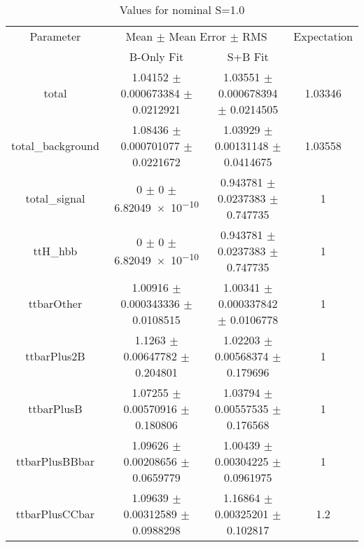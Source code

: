 \begin{table}
\centering
\caption{Values for nominal S=1.0}
\begin{tabular}{cccc}
\toprule
Parameter & \multicolumn{2}{c}{Mean $\pm$ Mean Error $\pm$ RMS} & Expectation\\
 & B-Only Fit & S+B Fit & \\
\midrule
total & \num{1.04152} $\pm$ \num{0.000673384} $\pm$ \num{0.0212921} & \num{1.03551} $\pm$ \num{0.000678394} $\pm$ \num{0.0214505} & \num{1.03346}\\
total\_background & \num{1.08436} $\pm$ \num{0.000701077} $\pm$ \num{0.0221672} & \num{1.03929} $\pm$ \num{0.00131148} $\pm$ \num{0.0414675} & \num{1.03558}\\
total\_signal & \num{0} $\pm$ \num{0} $\pm$ \num{6.82049e-10} & \num{0.943781} $\pm$ \num{0.0237383} $\pm$ \num{0.747735} & \num{1}\\
ttH\_hbb & \num{0} $\pm$ \num{0} $\pm$ \num{6.82049e-10} & \num{0.943781} $\pm$ \num{0.0237383} $\pm$ \num{0.747735} & \num{1}\\
ttbarOther & \num{1.00916} $\pm$ \num{0.000343336} $\pm$ \num{0.0108515} & \num{1.00341} $\pm$ \num{0.000337842} $\pm$ \num{0.0106778} & \num{1}\\
ttbarPlus2B & \num{1.1263} $\pm$ \num{0.00647782} $\pm$ \num{0.204801} & \num{1.02203} $\pm$ \num{0.00568374} $\pm$ \num{0.179696} & \num{1}\\
ttbarPlusB & \num{1.07255} $\pm$ \num{0.00570916} $\pm$ \num{0.180806} & \num{1.03794} $\pm$ \num{0.00557535} $\pm$ \num{0.176568} & \num{1}\\
ttbarPlusBBbar & \num{1.09626} $\pm$ \num{0.00208656} $\pm$ \num{0.0659779} & \num{1.00439} $\pm$ \num{0.00304225} $\pm$ \num{0.0961975} & \num{1}\\
ttbarPlusCCbar & \num{1.09639} $\pm$ \num{0.00312589} $\pm$ \num{0.0988298} & \num{1.16864} $\pm$ \num{0.00325201} $\pm$ \num{0.102817} & \num{1.2}\\
\bottomrule
\end{tabular}
\end{table}
